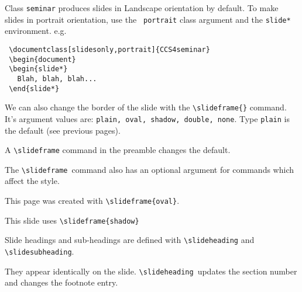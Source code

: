\documentclass[SRD,
               slidesonly,
                notes
              ]{CCS4seminar}
\begin{document}
\begin{slide}

  
  Class {\tt seminar} produces slides in Landscape orientation by
  default. To make slides in portrait orientation, use the {\tt
    portrait} class argument and the {\tt slide*} environment. e.g.
\begin{verbatim}
 \documentclass[slidesonly,portrait]{CCS4seminar}
 \begin{document}
 \begin{slide*}
   Blah, blah, blah...
 \end{slide*}
\end{verbatim}

\end{slide}      

\begin{slide}


  We can also change the border of the slide with the
  \verb=\slideframe{}= command. It's argument values are: {\tt plain,
    oval, shadow, double, none}. Type {\tt plain} is the default (see
  previous pages). 

  A \verb=\slideframe= command in the preamble changes the default.

  The \verb=\slideframe=\ command also has an optional argument for 
  commands which affect the style.

  This page was created with \verb=\slideframe{oval}=.
  
\end{slide}

\begin{slide}

  This slide uses \verb=\slideframe{shadow}=


  Slide headings and sub-headings are defined with
  \verb=\slideheading= and \verb=\slidesubheading=.

  They appear identically on the slide. \verb=\slideheading=\ updates
  the section number and changes the footnote entry.

\end{slide}
\end{document}
